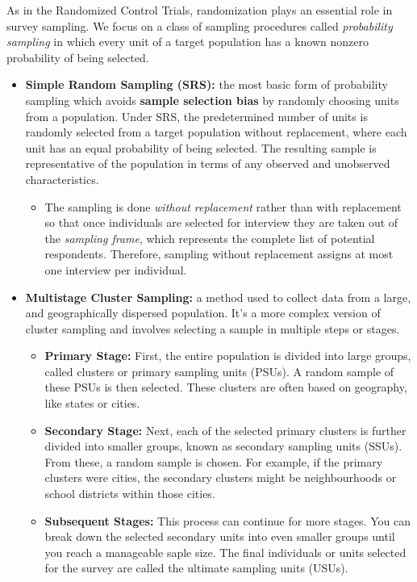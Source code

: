 \documentclass{article}
\begin{document}
    \noindent As in the Randomized Control Trials, randomization plays an
essential role in survey sampling. We focus on a class of sampling
procedures called \textit{probability sampling} in which every unit of a
target population has a known nonzero probability of being selected.\\
    \begin{itemize}
        \item \textbf{Simple Random Sampling (SRS):} the most basic form of
        probability sampling which avoids \textbf{sample selection bias} by
        randomly choosing units from a population. Under SRS, the
        predetermined number of units is randomly selected from a target
        population without replacement, where each unit has an equal
        probability of being selected. The resulting sample is
        representative of the population in terms of any observed and
        unobserved characteristics.
        \begin{itemize}
            \item The sampling is done \textit{without replacement} rather
            than with replacement so that once individuals are selected for
            interview they are taken out of the \textit{sampling frame},
            which represents the complete list of potential respondents.
            Therefore, sampling without replacement assigns at most one
            interview per individual.
        \end{itemize}
        \item \textbf{Multistage Cluster Sampling:} a method used to collect
        data from a large, and geographically dispersed population. It's a
        more complex version of cluster sampling and involves selecting a
        sample in multiple steps or stages.
        \begin{itemize}
            \item \textbf{Primary Stage:} First, the entire population is
            divided into large groups, called clusters or primary sampling
            units (PSUs). A random sample of these PSUs is then selected.
            These clusters are often based on geography, like states or cities.
            \item \textbf{Secondary Stage:} Next, each of the selected
            primary clusters is further divided into smaller groups, known
            as secondary sampling units (SSUs). From these, a random sample
            is chosen. For example, if the primary clusters were cities, the
            secondary clusters might be neighbourhoods or school districts
            within those cities.
            \item \textbf{Subsequent Stages:} This process can continue for
            more stages. You can break down the selected secondary units
            into even smaller groups until you reach a manageable saple
            size. The final individuals or units selected for the survey are
            called the ultimate sampling units (USUs).
        \end{itemize}
    \end{itemize}
\end{document}
